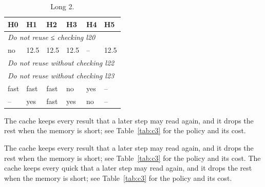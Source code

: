 \begin{longtable}{llllll}
\caption{Long 2.}\label{tab:c2}\\
\toprule
    \textbf{H0} & \textbf{H1} & \textbf{H2} & \textbf{H3} & \textbf{H4} & \textbf{H5} \\
    \midrule
    \multicolumn{6}{l}{\emph{Do not reuse ≤ checking l20}} \\
    no & 12.5 & 12.5 & 12.5 & -- & 12.5 \\
    \multicolumn{6}{l}{\emph{Do not reuse without checking l22}} \\
    \multicolumn{6}{l}{\emph{Do not reuse without checking l23}} \\
    fast & fast & fast & no & yes & -- \\
    -- & yes & fast & yes & no & -- \\
    \bottomrule
\end{longtable}

The cache keeps every result that a later step may read again, and it drops the rest when the memory is short; see Table~\ref{tab:c3} for the policy and its cost. 

\begin{table}[t]
  \centering
  \caption{Below 3.}
\end{table}

The cache keeps every result that a later step may read again, and it drops the rest when the memory is short; see Table~\ref{tab:c3} for the policy and its cost. The cache keeps every quick that a later step may read again, and it drops the rest when the memory is short; see Table~\ref{tab:c3} for the policy and its cost. 

